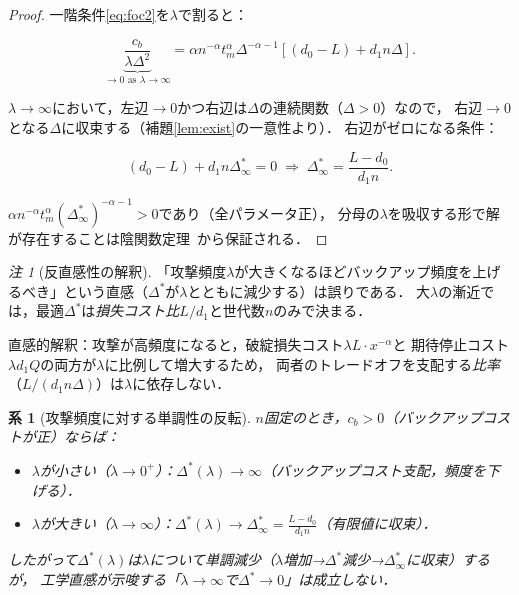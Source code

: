 \documentclass[12pt,a4paper]{article}
\theoremstyle{plain}
\newtheorem{corollary}[theorem]{系}
\theoremstyle{definition}
\theoremstyle{remark}
\newtheorem{remark}[theorem]{注}
\newcommand{\Dopt}{\Delta^*}
\begin{document}
\begin{proof}
一階条件\eqref{eq:foc2}を$\lambda$で割ると：

\begin{equation}\label{eq:foc_lambda}
  \underbrace{\frac{c_b}{\lambda\Delta^2}}_{\to0\text{ as }\lambda\to\infty}
  = \alpha n^{-\alpha}t_m^{\alpha}\Delta^{-\alpha-1}\left[(d_0-L)+d_1 n\Delta\right].
\end{equation}

$\lambda\to\infty$において，左辺$\to0$かつ右辺は$\Delta$の連続関数（$\Delta>0$）なので，
右辺$\to0$となる$\Delta$に収束する（補題\ref{lem:exist}の一意性より）．
右辺がゼロになる条件：

\begin{equation*}
  (d_0-L)+d_1 n\Delta^{*}_\infty=0
  \;\Longrightarrow\;
  \Dopt_\infty=\frac{L-d_0}{d_1 n}.
\end{equation*}

$\alpha n^{-\alpha}t_m^\alpha(\Dopt_\infty)^{-\alpha-1}>0$であり（全パラメータ正），
分母の$\lambda$を吸収する形で解が存在することは陰関数定理~\cite{rudin1976}から保証される．
\end{proof}

\begin{remark}[反直感性の解釈]
「攻撃頻度$\lambda$が大きくなるほどバックアップ頻度を上げるべき」という直感（$\Dopt$が$\lambda$とともに減少する）は誤りである．
大$\lambda$の漸近では，最適$\Dopt$は\emph{損失コスト比}$L/d_1$と世代数$n$のみで決まる．

直感的解釈：攻撃が高頻度になると，破綻損失コスト$\lambda L\cdot x^{-\alpha}$と
期待停止コスト$\lambda d_1 Q$の両方が$\lambda$に比例して増大するため，
両者のトレードオフを支配する\emph{比率}（$L/(d_1 n\Delta)$）は$\lambda$に依存しない．
\end{remark}

\begin{corollary}[攻撃頻度に対する単調性の反転]\label{cor:nonmonotone}
$n$固定のとき，$c_b>0$（バックアップコストが正）ならば：
\begin{itemize}
\item $\lambda$が小さい（$\lambda\to0^+$）：$\Dopt(\lambda)\to\infty$（バックアップコスト支配，頻度を下げる）．
\item $\lambda$が大きい（$\lambda\to\infty$）：$\Dopt(\lambda)\to\Dopt_\infty=\frac{L-d_0}{d_1 n}$（有限値に収束）．
\end{itemize}
したがって$\Dopt(\lambda)$は$\lambda$について\emph{単調減少}（$\lambda$増加→$\Dopt$減少→$\Dopt_\infty$に収束）するが，
工学直感が示唆する「$\lambda\to\infty$で$\Dopt\to0$」は成立しない．
\end{corollary}
\end{document}

